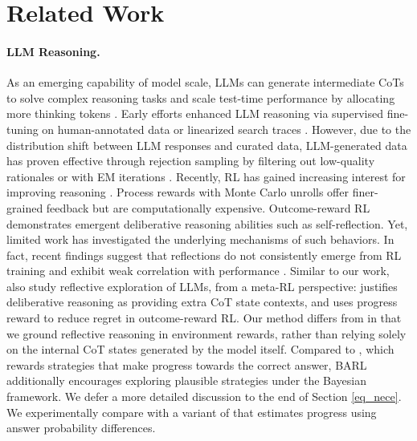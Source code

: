 \section{Related Work}
\paragraph{LLM Reasoning.} As an emerging capability of model scale, LLMs can generate intermediate CoTs to solve complex reasoning tasks \citep{wei2022chain,kojima2022large} and scale test-time performance by allocating more thinking tokens \citep{snell2024scaling,brown2024large}. Early efforts enhanced LLM reasoning via supervised fine-tuning on human-annotated data \citep{cobbe2021training,yue2023mammoth,yu2023metamath} or linearized search traces \citep{lehnert2024beyond,gandhi2024stream}. 
However, due to the distribution shift between LLM responses and curated data, LLM-generated data has proven effective through rejection sampling \citep{dong2023raft,yuan2023scaling} by filtering out low-quality rationales \citep{zelikman2022star,zelikman2024quiet} or with EM iterations \citep{singh2023beyond,zhong2025brite}. Recently, RL has gained increasing interest for improving reasoning \citep{aksitov2023rest,havrilla2024teaching,wang2024offline,shao2024deepseekmath}. Process rewards \citep{uesato2022solving,lightman2023let} with Monte Carlo unrolls \citep{kazemnejad2024vineppo,wang2023math,wang2024multi,luo2024improve} offer finer-grained feedback but are computationally expensive. Outcome-reward RL \citep{guo2025deepseek} demonstrates emergent deliberative reasoning abilities such as self-reflection. Yet, limited work has investigated the underlying mechanisms of such behaviors. In fact, recent findings suggest that reflections do not consistently emerge from RL training and exhibit weak correlation with performance \citep{liu2025understanding}.
Similar to our work, \cite{xiang2025towards,qu2025optimizing} also study reflective exploration of LLMs, from a meta-RL \citep{duan2016rl} perspective: \cite{xiang2025towards} justifies deliberative reasoning as providing extra CoT state contexts, and \cite{qu2025optimizing} uses progress reward \citep{setlur2024rewarding} to reduce regret in outcome-reward RL. Our method differs from \cite{xiang2025towards} in that we ground reflective reasoning in environment rewards, rather than relying solely on the internal CoT states generated by the model itself. Compared to \cite{qu2025optimizing}, which rewards strategies that make progress towards the correct answer, BARL additionally encourages exploring plausible strategies under the Bayesian framework. We defer a more detailed discussion to the end of Section \ref{eq_nece}. We experimentally compare with a variant of \cite{qu2025optimizing} that estimates progress using answer probability differences. 
